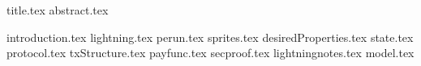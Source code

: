 \documentclass[11pt]{llncs}
\begin{document}
{title.tex}
\thispagestyle{plain}
{abstract.tex}

{introduction.tex}
{lightning.tex}
{perun.tex}
{sprites.tex}
{desiredProperties.tex}
{state.tex}
{protocol.tex}
{txStructure.tex}
{payfunc.tex}
{secproof.tex}
{lightningnotes.tex}
{model.tex}

\end{document}
